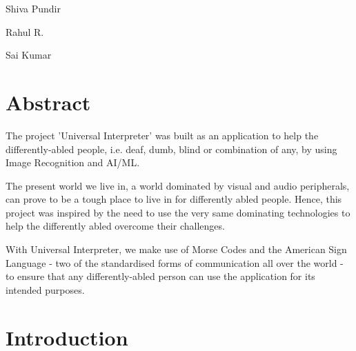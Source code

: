 \documentclass[14pt]{report}
\newcommand{\changefont}{
    \fontsize{10}{10}\selectfont
}
\renewcommand{\footrulewidth}{0.4pt}
\begin{document}
		\hfill Shiva Pundir 

		\hfill Rahul R. 

		\hfill Sai Kumar 


	\chapter*{Abstract}\label{chapter}
		

		The project 'Universal Interpreter' was built as an application to help the differently-abled people, i.e. deaf, dumb, blind or combination of any, by using Image Recognition and AI/ML. \newline
		
		The present world we live in, a world dominated by visual and audio peripherals, can prove to be a tough place to live in for differently abled people. Hence, this project was inspired by the need to use the very same dominating technologies to help the differently abled overcome their challenges. \newline 

		With Universal Interpreter, we make use of Morse Codes and the American Sign Language - two of the standardised forms of communication all over the world - to ensure that any differently-abled person can use the application for its intended purposes.\newline 

	



	\renewcommand{\footrulewidth}{0pt}

	\tableofcontents

	\newpage


	\listoffigures

	\newpage

	\renewcommand{\footrulewidth}{0.4pt}



	\fancyfoot[R]{\changefont Page \thepage}


	\chapter{Introduction}\label{chapter1}
		
\end{document}
